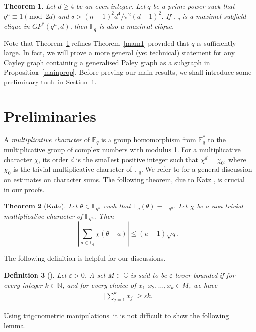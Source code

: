 \documentclass[12pt,reqno]{amsart}
\newtheorem{thm}{Theorem}[section]
\newtheorem{defn}[thm]{Definition}
\newcommand{\C}{\mathbb{C}}
\newcommand{\N}{\mathbb{N}}
\newcommand{\F}{\mathbb{F}}
\begin{document}
\begin{thm}\label{main2}
Let $d \geq 4$ be an even integer. Let $q$ be a prime power such that $q^n \equiv 1 \pmod {2d}$ and $q>(n-1)^2d^4/\pi^2(d-1)^2$. If $\F_q$ is a maximal subfield clique in $GP^*(q^n,d)$, then $\F_q$ is also a maximal clique. 
\end{thm}

Note that Theorem~\ref{main2} refines Theorem~\ref{main1} provided that $q$ is sufficiently large. In fact, we will prove a more general (yet technical) statement for any Cayley graph containing a generalized Paley graph as a subgraph in Proposition~\ref{mainprop}. Before proving our main results, we shall introduce some preliminary tools in Section~\ref{prelim}. 


\section{Preliminaries}\label{prelim}
A {\em multiplicative character} of $\F_q$ is a group homomorphism from $\F_q^*$ to the multiplicative group of complex numbers with modulus 1. For a multiplicative character $\chi$, its order $d$ is the smallest positive integer such that $\chi^d=\chi_0$, where $\chi_0$ is the trivial multiplicative character of $\F_q$. We refer to \cite[Chapter 5]{LN} for a general discussion on estimates on character sums. The following theorem, due to Katz \cite{K89}, is crucial in our proofs.


\begin{thm}[Katz]\label{Katz}
Let $\theta \in \F_{q^n}$ such that $\F_q(\theta)=\F_{q^n}$. Let $\chi$ be a non-trivial multiplicative character of $\mathbb{F}_{q^{n}}.$ Then
$$
\left|\sum_{a \in \mathbb{F}_{q}} \chi(\theta+a)\right| \leq(n-1) \sqrt{q}.
$$
\end{thm}

The following definition is helpful for our discussions.

\begin{defn}[{\cite[Definition 2.16]{AY}}]\label{defn:epsilon-bounded}\rm
Let $\varepsilon>0$. A set $M \subset \C$ is said to be $\varepsilon$-lower bounded if for every integer $k \in \N$, and for every choice of $x_1,x_2,\ldots, x_k \in M$, we have
\begin{align*}
\bigg|\sum_{j=1}^{k} x_j\bigg| \geq \varepsilon k.
\end{align*}
\end{defn}

Using trigonometric manipulations, it is not difficult to show the following lemma. 
\end{document}
